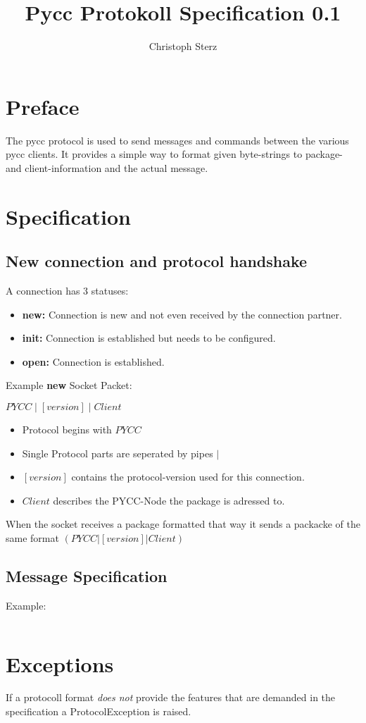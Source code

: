 \documentclass{scrartcl}
\title{Pycc Protokoll Specification 0.1}
\author{Christoph Sterz}
\begin{document}
	\section{Preface}
	The pycc protocol is used to send messages and commands between the various pycc clients. It provides a simple way to format given 
	byte-strings to package- and client-information and the actual message.

	\section{Specification}
	\subsection{New connection and protocol handshake}
	A connection has 3 statuses:
	\begin{itemize}
		\item \textbf{new:} \quad Connection is new and not even received by the connection partner.
		\item \textbf{init:} \quad	Connection is established but needs to be configured.
		\item \textbf{open:} \quad	Connection is established.
	\end{itemize}
	
	Example \textbf{new} Socket Packet:	\begin{center}{$PYCC \mid [version] \mid Client$}\end{center}
	\begin{itemize}
		\item	Protocol begins with \quad $PYCC$
		\item	Single Protocol parts are seperated by pipes \quad $\mid$
		\item	$[version]$ contains the protocol-version used for this connection.
		\item $Client$ describes the PYCC-Node the package is adressed to.
	\end{itemize}

When the socket receives a package formatted that way it sends a packacke of the same format $(PYCC|[version]|Client)$

	\subsection{Message Specification}
	Example:	\begin{center}{$$}\end{center}

	\section{Exceptions}
	If a protocoll format \emph{does not} provide the features that are demanded in the specification a ProtocolException is raised.
\end{document}
